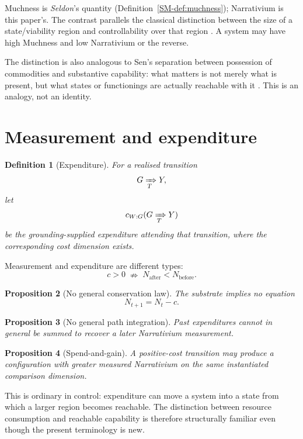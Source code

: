 \documentclass[11pt,a4paper]{article}
\newtheorem{definition}{Definition}[section]
\newtheorem{proposition}[definition]{Proposition}
\theoremstyle{remark}
\begin{document}
Muchness is \emph{Seldon}'s quantity (Definition~\ref{SM-def:muchness}); Narrativium is this paper's.
The contrast parallels the classical distinction between the size of a state/viability region and controllability over that region \citep{kalman1960control,aubin1991viability}. A system may have high Muchness and low Narrativium or the reverse.

The distinction is also analogous to Sen's separation between possession of commodities and substantive capability: what matters is not merely what is present, but what states or functionings are actually reachable with it \citep{sen1985commodities}. This is an analogy, not an identity.

\section{Measurement and expenditure}\label{sec:measurement-expenditure}

\begin{definition}[Expenditure]\label{def:expenditure}
For a realised transition
\[
G\xRightarrow[T]{}Y,
\]
let
\[
c_{W:G}(G\xRightarrow[T]{}Y)
\]
be the grounding-supplied expenditure attending that transition, where the corresponding cost dimension exists.
\end{definition}

Measurement and expenditure are different types:
\[
\boxed{
c>0
\;\nRightarrow\;
N_{\mathrm{after}}<N_{\mathrm{before}}.
}
\]

\begin{proposition}[No general conservation law]\label{prop:no-conservation}
The substrate implies no equation
\[
N_{t+1}=N_t-c.
\]
\end{proposition}

\begin{proposition}[No general path integration]\label{prop:no-path}
Past expenditures cannot in general be summed to recover a later Narrativium measurement.
\end{proposition}

\begin{proposition}[Spend-and-gain]\label{prop:spend-gain}
A positive-cost transition may produce a configuration with greater measured Narrativium on the same instantiated comparison dimension.
\end{proposition}

This is ordinary in control: expenditure can move a system into a state from which a larger region becomes reachable. The distinction between resource consumption and reachable capability is therefore structurally familiar even though the present terminology is new.
\end{document}
